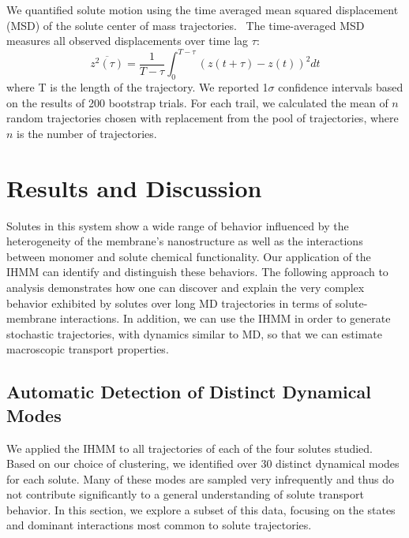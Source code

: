 \documentclass[journal=jpcbfk,manuscript=article]{achemso}
\begin{document}
  We quantified solute motion using the time averaged mean squared displacement (MSD)
  of the solute center of mass trajectories.~\cite{meroz_toolbox_2015} The time-averaged MSD measures all observed
  displacements over time lag $\tau$:
  \begin{equation}
  	\overline{z^2(\tau)} = \dfrac{1}{T - \tau}\int_{0}^{T - \tau} (z(t + \tau) - z(t))^2 dt
  \label{eqn:tamsd}
  \end{equation}
  where T is the length of the trajectory. We reported 1$\sigma$ confidence intervals 
  based on the results of 200 bootstrap trials. For each trail, we calculated the mean of 
  $n$ random trajectories chosen with replacement from the pool of trajectories, where 
  $n$ is the number of trajectories.

  \section{Results and Discussion}
  
  
  Solutes in this system show a wide range of behavior influenced by the 
  heterogeneity of the membrane's nanostructure as well as the interactions 
  between monomer and solute chemical functionality. Our application of the 
  IHMM can identify and distinguish these behaviors. The following approach 
  to analysis demonstrates how one can discover and explain the very complex
  behavior exhibited by solutes over long MD trajectories in terms of 
  solute-membrane interactions. In addition, we can use the IHMM in order to generate
  stochastic trajectories, with dynamics similar to MD, so that we can estimate 
  macroscopic transport properties. 	
  
  \subsection{Automatic Detection of Distinct Dynamical Modes}\label{section:find_modes}
  
  We applied the IHMM to all trajectories of each of the four solutes studied.
  Based on our choice of clustering, we identified over 30 distinct dynamical
  modes for each solute. Many of these modes are sampled very infrequently and thus
  do not contribute significantly to a general understanding of solute transport behavior.
  In this section, we explore a subset of this data, focusing on the states
  and dominant interactions most common to solute trajectories.
\end{document}
